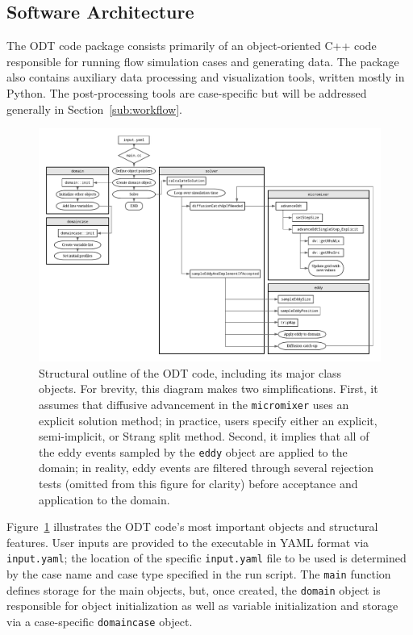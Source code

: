 \documentclass[preprint,12pt, a4paper]{elsarticle}
\begin{document}
\subsection{Software Architecture}
\label{sub:architecture}

The ODT code package consists primarily of an object-oriented C++ code responsible for running flow simulation cases and generating data. The package also contains auxiliary data processing and visualization tools, written mostly in Python. The post-processing tools are case-specific but will be  addressed generally in Section~\ref{sub:workflow}. 

\begin{figure}
	\begin{center}
        \includegraphics[width=\textwidth]{fig_odt_flow_chart.pdf}
	\end{center}
	\caption{Structural outline of the ODT code, including its major class objects. For brevity, this diagram makes two simplifications. First, it assumes that diffusive advancement in the \texttt{micromixer} uses an explicit solution method; in practice, users specify either an explicit, semi-implicit, or Strang split method. Second, it implies that all of the eddy events sampled by the \texttt{eddy} object are applied to the domain; in reality, eddy events are filtered through several rejection tests (omitted from this figure for clarity) before acceptance and application to the domain.}
\label{fig:flowchart}
\end{figure}

Figure~\ref{fig:flowchart} illustrates the ODT code's most important objects and structural features. User inputs are provided to the executable in YAML \cite{Beder_2008} format via \texttt{input.yaml}; the location of the specific \texttt{input.yaml} file to be used is determined by the case name and case type specified in the run script. The \texttt{main} function defines storage for the main objects, but, once created, the \texttt{domain} object is responsible for object initialization as well as variable initialization and storage via a case-specific \texttt{domaincase} object. 
\end{document}
